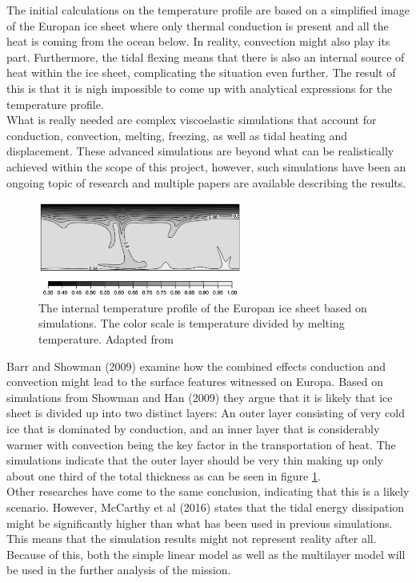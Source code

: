 \label{sec:IceTemperatureProfile2}
The initial calculations on the temperature profile are based on a simplified image of the Europan ice sheet where only thermal conduction is present and all the heat is coming from the ocean below. In reality, convection might also play its part. Furthermore, the tidal flexing means that there is also an internal source of heat within the ice sheet, complicating the situation even further. The result of this is that it is nigh impossible to come up with analytical expressions for the temperature profile.\\

\noindent
What is really needed are complex viscoelastic simulations that account for conduction, convection, melting, freezing, as well as tidal heating and displacement. These advanced simulations are beyond what can be realistically achieved within the scope of this project, however, such simulations have been an ongoing topic of research and multiple papers are available describing the results.\\

\begin{figure}[ht]
	\centering
	\includegraphics[width = 0.6\textwidth]{figures/LAMC/2layer}
	\caption{The internal temperature profile of the Europan ice sheet based on simulations. The color scale is temperature divided by melting temperature. Adapted from \cite{article:barr2014a}}
	\label{fig:2layer}
\end{figure}

\noindent 
Barr and Showman (2009)\cite{article:barr2014a} examine how the combined effects conduction and convection might lead to the surface features witnessed on Europa. Based on simulations from Showman and Han (2009)\cite{article:showman2005a} they argue that it is likely that ice sheet is divided up into two distinct layers: An outer layer consisting of very cold ice that is dominated by conduction, and an inner layer that is considerably warmer with convection being the key factor in the transportation of heat. The simulations indicate that the outer layer should be very thin making up only about one third of the total thickness as can be seen in figure \ref{fig:2layer}. \\

\noindent
Other researches have come to the same conclusion, indicating that this is a likely scenario\cite{article:mckinnon1999a}\cite{article:tobie2003a}. However, McCarthy et al (2016)\cite{article:mccarthy2016a} states that the tidal energy dissipation might be significantly higher than what has been used in previous simulations. This means that the simulation results might not represent reality after all. Because of this, both the simple linear model as well as the multilayer model will be used in the further analysis of the mission.
